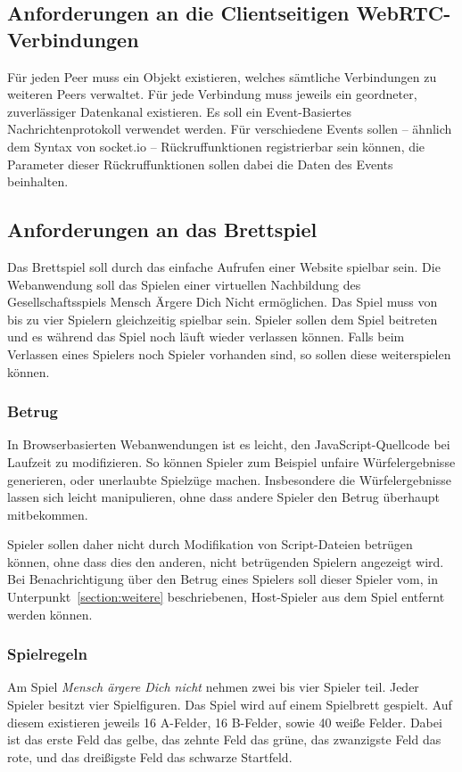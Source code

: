 \subsection{Anforderungen an die Clientseitigen WebRTC-Verbindungen}
Für jeden Peer muss ein Objekt existieren, welches sämtliche Verbindungen zu weiteren Peers verwaltet. Für jede Verbindung muss jeweils ein geordneter, zuverlässiger Datenkanal existieren. Es soll ein Event-Basiertes Nachrichtenprotokoll verwendet werden. Für verschiedene Events sollen -- ähnlich dem Syntax von socket.io -- Rückruffunktionen registrierbar sein können, die Parameter dieser Rückruffunktionen sollen dabei die Daten des Events beinhalten.

\subsection{Anforderungen an das Brettspiel}
Das Brettspiel soll durch das einfache Aufrufen einer Website spielbar sein. Die Webanwendung soll das Spielen einer virtuellen Nachbildung des Gesellschaftsspiels \glqq{}Mensch Ärgere Dich Nicht\grqq{} ermöglichen. Das Spiel muss von bis zu vier Spielern gleichzeitig spielbar sein. Spieler sollen dem Spiel beitreten und es während das Spiel noch läuft wieder verlassen können. Falls beim Verlassen eines Spielers noch Spieler vorhanden sind, so sollen diese weiterspielen können. 

\subsubsection{Betrug}
In Browserbasierten Webanwendungen ist es leicht, den JavaScript-Quellcode bei Laufzeit zu modifizieren. So können Spieler zum Beispiel unfaire Würfelergebnisse generieren, oder unerlaubte Spielzüge machen. Insbesondere die Würfelergebnisse lassen sich leicht manipulieren, ohne dass andere Spieler den Betrug überhaupt mitbekommen.\par

Spieler sollen daher nicht durch Modifikation von Script-Dateien betrügen können, ohne dass dies den anderen, nicht betrügenden Spielern angezeigt wird. Bei Benachrichtigung über den Betrug eines Spielers soll dieser Spieler vom, in Unterpunkt~\ref{section:weitere} beschriebenen, \glqq{}Host\grqq{}-Spieler aus dem Spiel entfernt werden können.\par

\subsubsection{Spielregeln}
Am Spiel \textit{Mensch ärgere Dich nicht} nehmen zwei bis vier Spieler teil. Jeder Spieler besitzt vier Spielfiguren. Das Spiel wird auf einem Spielbrett gespielt. Auf diesem existieren jeweils 16 A-Felder, 16 B-Felder, sowie 40 weiße Felder. Dabei ist das erste Feld das gelbe, das zehnte Feld das grüne, das zwanzigste Feld das rote, und das dreißigste Feld das schwarze Startfeld.\par 

